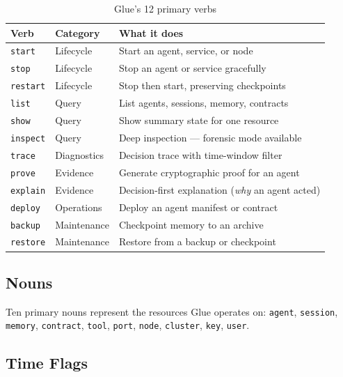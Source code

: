 \begin{table}[H]
\centering
\renewcommand{\arraystretch}{1.4}
\begin{tabular}{@{}llp{7cm}@{}}
\toprule
\textbf{Verb} & \textbf{Category} & \textbf{What it does} \\
\midrule
\texttt{start}   & Lifecycle   & Start an agent, service, or node \\
\texttt{stop}    & Lifecycle   & Stop an agent or service gracefully \\
\texttt{restart} & Lifecycle   & Stop then start, preserving checkpoints \\
\texttt{list}    & Query       & List agents, sessions, memory, contracts \\
\texttt{show}    & Query       & Show summary state for one resource \\
\texttt{inspect} & Query       & Deep inspection — forensic mode available \\
\texttt{trace}   & Diagnostics & Decision trace with time-window filter \\
\texttt{prove}   & Evidence    & Generate cryptographic proof for an agent \\
\texttt{explain} & Evidence    & Decision-first explanation (\textit{why} an agent acted) \\
\texttt{deploy}  & Operations  & Deploy an agent manifest or contract \\
\texttt{backup}  & Maintenance & Checkpoint memory to an archive \\
\texttt{restore} & Maintenance & Restore from a backup or checkpoint \\
\bottomrule
\end{tabular}
\caption{Glue's 12 primary verbs}
\end{table}

\subsection{Nouns}

Ten primary nouns represent the resources Glue operates on:
\texttt{agent}, \texttt{session}, \texttt{memory}, \texttt{contract},
\texttt{tool}, \texttt{port}, \texttt{node}, \texttt{cluster},
\texttt{key}, \texttt{user}.

\subsection{Time Flags}

